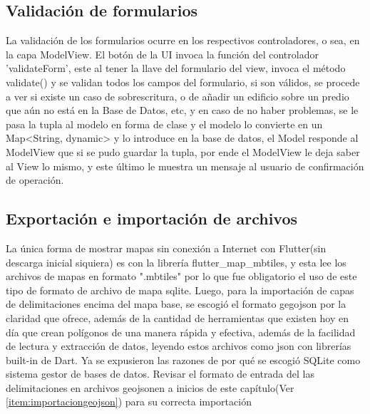\subsection{Validación de formularios}
La validación de los formularios ocurre en los respectivos controladores, o sea, en la capa ModelView. El botón de la UI invoca la función del controlador 'validateForm', este al tener la llave del formulario del view,
invoca el método validate() y se validan todos los campos del formulario, si son válidos, se procede a ver si existe un caso de sobrescritura, o de añadir un edificio sobre un predio que aún no está en la Base de Datos, etc,
y en caso de no haber problemas, se le pasa la tupla al modelo en forma de clase y el modelo lo convierte en un Map<String, dynamic> y lo introduce en la base de datos, el Model responde al ModelView que si se pudo guardar la tupla,
por ende el ModelView le deja saber al View lo mismo, y este último le muestra un mensaje al usuario de confirmación de operación.

\subsection{Exportación e importación de archivos}
La única forma de mostrar mapas sin conexión a Internet con Flutter(sin descarga inicial siquiera) es con la librería flutter\_map\_mbtiles, y esta lee los archivos de mapas en formato ".mbtiles" por lo que fue obligatorio el uso de este tipo de formato de archivo de mapa
sqlite. Luego, para la importación de capas de delimitaciones encima del mapa base, se escogió el formato gegojson por la claridad que ofrece, además de la cantidad de herramientas que existen hoy en día que crean polígonos
de una manera rápida y efectiva, además de la facilidad de lectura y extracción de datos, leyendo estos archivos como json con librerías built-in de Dart. Ya se expusieron las razones de por qué se escogió SQLite como sistema gestor de bases de datos.
Revisar el formato de entrada del las delimitaciones en archivos geojsonen a inicios de este capítulo(Ver \ref{item:importaciongeojson}) para su correcta importación
